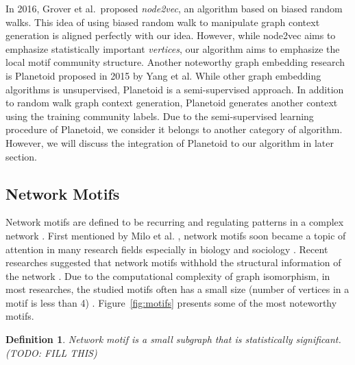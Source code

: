 \documentclass[letterpaper]{article}
\newtheorem{ntdef}{Definition}
\begin{document}
             
            In 2016, Grover et al.\ proposed \emph{node2vec}, an algorithm based on biased random
            walks. This idea of using biased random walk to manipulate graph context generation
            is aligned perfectly with our idea. However, while node2vec aims to emphasize statistically
            important \emph{vertices}, our algorithm aims to emphasize the local motif community
            structure. Another noteworthy graph embedding research is Planetoid \cite{planetoid} 
            proposed in 2015 by Yang et al. While other graph embedding algorithms is unsupervised, 
            Planetoid is a semi-supervised approach. In addition to random walk graph context generation, 
            Planetoid generates another context using the training community labels. Due to the
            semi-supervised learning procedure of Planetoid, we consider it belongs to another
            category of algorithm. However, we will discuss the integration of Planetoid to our
            algorithm in later section.

        \subsection{Network Motifs}

            Network motifs are defined to be recurring and regulating patterns in a complex network 
            \cite{netmotif}. First mentioned by Milo et al. \cite{motifblockmilo}, network motifs
            soon became a topic of attention in many research fields especially in biology and sociology
            \cite{masoudirev}. Recent researches suggested that network motifs withhold the structural 
            information of the network \cite{motifcon, harvardmotif, deepgraphkernel}. Due to the
            computational complexity of graph isomorphism, in most researches, the studied motifs 
            often has a small size (number of vertices in a motif is less than 4) \cite{motifdectrev}.
            Figure~\ref{fig:motifs} presents some of the most noteworthy motifs.


            \begin{ntdef}
                Network motif is a small subgraph that is statistically significant. (TODO: FILL THIS)
            \end{ntdef}
\end{document}
